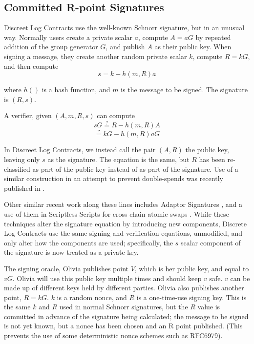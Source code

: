 \documentclass[10pt]{article}
\begin{document}
\subsection*{Committed R-point Signatures}

Discreet Log Contracts use the well-known Schnorr signature\cite{schnorr1990efficient}, but in an unusual way.  Normally users create a private scalar \(a\), compute \(A = aG\) by repeated addition of the group generator \(G\), and publish \(A\) as their public key.  When signing a message, they create another random private scalar \(k\), compute \(R = kG\), and then compute  \[s = k - h(m, R)a\]

where \(h()\) is a hash function, and \(m\) is the message to be signed.  The signature is \((R, s)\).

A verifier, given \((A, m, R, s)\) can compute
\[sG \stackrel{?}{=} R - h(m, R)A\]
\[\stackrel{?}{=} kG - h(m, R)aG\]

In Discreet Log Contracts, we instead call the pair \((A, R)\) the public key, leaving only \(s\) as the signature.  The equation is the same, but \(R\) has been re-classified as part of the public key instead of as part of the signature.  Use of a similar construction in an attempt to prevent double-spends was recently published in \cite{cryptoeprint:2017:394}.

Other similar recent work along these lines includes  Adaptor Signatures \cite{adaptor}, and a use of them in Scriptless Scripts for cross chain atomic swaps \cite{cryptoeprint:2018:472}.  While these techniques alter the signature equation by introducing new components, Discrete Log Contracts use the same signing and verification equations, unmodified, and only alter how the components are used; specifically, the \(s\) scalar component of the signature is now treated as a private key.

The signing oracle, Olivia publishes point \(V\), which is her public key, and equal to \(vG\).  Olivia will use this public key multiple times and should keep \(v\) safe.  \(v\) can be made up of different keys held by different parties.  Olivia also publishes another point, \(R = kG\).  \(k\) is a random nonce, and \(R\) is a one-time-use signing key.  This is the same \(k\) and \(R\)  used in normal Schnorr signatures, but the \(R\) value is committed in advance of the signature being calculated; the message to be signed is not yet known, but a nonce has been chosen and an R point published.  (This prevents the use of some deterministic nonce schemes such as RFC6979\cite{rfc}).
\end{document}
